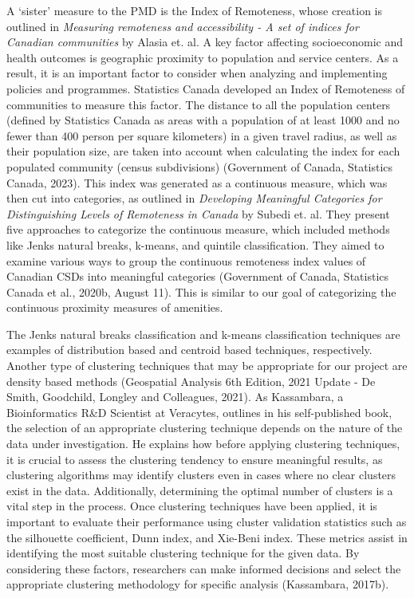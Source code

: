 \documentclass[11pt, a4paper]{article}
\begin{document}
A `sister' measure to the PMD is the Index of Remoteness, whose creation is outlined in \textit{Measuring remoteness and accessibility - A set of indices for Canadian communities} by Alasia et. al. A key factor affecting socioeconomic and health outcomes is geographic proximity to population and service centers. As a result, it is an important factor to consider when analyzing and implementing policies and programmes. Statistics Canada developed an Index of Remoteness of communities to measure this factor. The distance to all the population centers (defined by Statistics Canada as areas with a population of at least 1000 and no fewer than 400 person per square kilometers) in a given travel radius, as well as their population size, are taken into account when calculating the index for each populated community (census subdivisions) (Government of Canada, Statistics Canada, 2023). This index was generated as a continuous measure, which was then cut into categories, as outlined in \textit{Developing Meaningful Categories for Distinguishing Levels of Remoteness in Canada} by Subedi et. al. They present five approaches to categorize the continuous measure, which included methods like Jenks natural breaks, k-means, and quintile classification. They aimed to examine various ways to group the continuous remoteness index values of Canadian CSDs into meaningful categories (Government of Canada, Statistics Canada et al., 2020b, August 11). This is similar to our goal of categorizing the continuous proximity measures of amenities.  
\par
The Jenks natural breaks classification and k-means classification techniques are examples of distribution based and centroid based techniques, respectively. Another type of clustering techniques that may be appropriate for our project are density based methods (Geospatial Analysis 6th Edition, 2021 Update - De Smith, Goodchild, Longley and Colleagues, 2021). As Kassambara, a Bioinformatics R\&D Scientist at Veracytes, outlines in his self-published book, the selection of an appropriate clustering technique depends on the nature of the data under investigation. He explains how before applying clustering techniques, it is crucial to assess the clustering tendency to ensure meaningful results, as clustering algorithms may identify clusters even in cases where no clear clusters exist in the data. Additionally, determining the optimal number of clusters is a vital step in the process. Once clustering techniques have been applied, it is important to evaluate their performance using cluster validation statistics such as the silhouette coefficient, Dunn index, and Xie-Beni index. These metrics assist in identifying the most suitable clustering technique for the given data. By considering these factors, researchers can make informed decisions and select the appropriate clustering methodology for specific analysis (Kassambara, 2017b).
\end{document}
